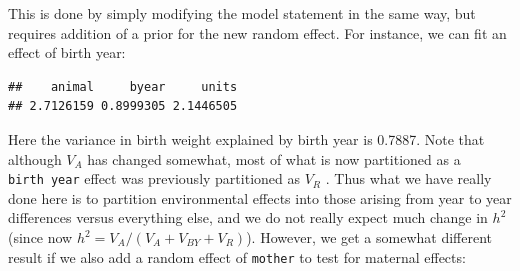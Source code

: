 \documentclass[
  12pt,
]{book}
\newenvironment{Shaded}{\begin{snugshade}}{\end{snugshade}}
\newcommand{\DataTypeTok}[1]{\textcolor[rgb]{0.13,0.29,0.53}{#1}}
\newcommand{\DecValTok}[1]{\textcolor[rgb]{0.00,0.00,0.81}{#1}}
\newcommand{\FloatTok}[1]{\textcolor[rgb]{0.00,0.00,0.81}{#1}}
\newcommand{\KeywordTok}[1]{\textcolor[rgb]{0.13,0.29,0.53}{\textbf{#1}}}
\newcommand{\NormalTok}[1]{#1}
\newcommand{\OperatorTok}[1]{\textcolor[rgb]{0.81,0.36,0.00}{\textbf{#1}}}
\newcommand{\OtherTok}[1]{\textcolor[rgb]{0.56,0.35,0.01}{#1}}
\newcommand{\StringTok}[1]{\textcolor[rgb]{0.31,0.60,0.02}{#1}}
\begin{document}
This is done by simply modifying the model statement in the same way, but requires addition of a prior for the new random effect. For instance, we can fit an effect of birth year:

\begin{Shaded}
\end{Shaded}

\begin{verbatim}
##    animal     byear     units 
## 2.7126159 0.8999305 2.1446505
\end{verbatim}

Here the variance in birth weight explained by birth year is 0.7887. Note that although \(V_A\) has changed somewhat, most of what is now partitioned as a \texttt{birth\ year} effect was previously partitioned as \(V_R\) . Thus what we have really done here is to partition environmental effects into those arising from year to year differences versus everything else, and we do not really expect much change in \(h^2\) (since now \(h^2 = V_A /(V_A + V_{BY} + V_R )\)). However, we get a somewhat different result if we also add a random effect of \texttt{mother} to test for maternal effects:
\end{document}
